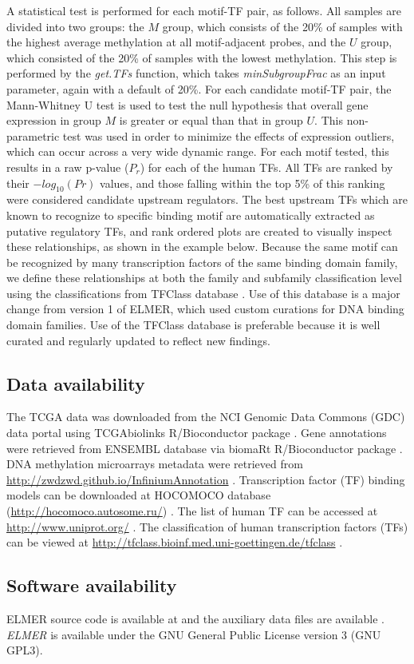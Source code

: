 A statistical test is performed for each motif-TF pair, as follows. All samples
are divided into two groups: the $M$ group, which consists
of the 20\% of samples with the highest average methylation at all motif-adjacent
probes, and the $U$ group, which consisted of the 20\%  of samples with the lowest
methylation. This step is performed by the \textit{get.TFs} function,
which takes \textit{minSubgroupFrac} as an input parameter, again with a default of 20\%.
For each candidate motif-TF pair, the Mann-Whitney U test is used to test
the null hypothesis that overall gene expression in group $M$ is greater or equal
than that in group $U$. This non-parametric test was used in order to minimize the
effects of expression outliers, which can occur across a very wide dynamic range.
For each motif tested, this results in a raw p-value ($P_r$) for each of the human TFs.
All TFs are ranked by their $-log_{10}(Pr)$ values, and those falling within the top 5\% of
this ranking were considered candidate upstream regulators. The best upstream
TFs which are known to recognize to specific binding motif are automatically extracted as putative
regulatory TFs, and rank ordered plots are created to visually inspect these
relationships, as shown in the example below. Because the same motif can be
recognized by many transcription factors of the same binding domain family,
we define these relationships at both the family and subfamily classification level using the
classifications from TFClass database \cite{wingender2013tfclass}.
 Use of this database is a major change from version 1 of ELMER, which used
 custom curations for DNA binding domain families. Use of the TFClass database
 is preferable because it is well curated and regularly updated to reflect new findings.


\subsection*{Data availability} %
The TCGA data was downloaded from the NCI Genomic Data Commons (GDC) data portal \cite{grossman2016toward}
using TCGAbiolinks R/Bioconductor package \cite{colaprico2015tcgabiolinks,10.12688/f1000research.8923.2}.
Gene annotations were retrieved from ENSEMBL \cite{yates2015ensembl} database via biomaRt R/Bioconductor
package \cite{durinck2005biomart,durinck2009mapping}.
DNA methylation microarrays metadata were retrieved from \url{http://zwdzwd.github.io/InfiniumAnnotation} \cite{doi:10.1093/nar/gkw967}.
Transcription factor (TF) binding models can be downloaded at HOCOMOCO database (\url{http://hocomoco.autosome.ru/}) \cite{kulakovskiy2016hocomoco}.
The list of human TF can be accessed at \url{http://www.uniprot.org/}  \cite{apweiler2004uniprot}.
The classification of human transcription factors (TFs) can be viewed at \url{http://tfclass.bioinf.med.uni-goettingen.de/tfclass}  \cite{wingender2013tfclass}.

\subsection*{Software availability}

ELMER	source code  is available at 
and the auxiliary data files are available .
\textit{ELMER} is available under the GNU General Public License version 3 (GNU GPL3).

